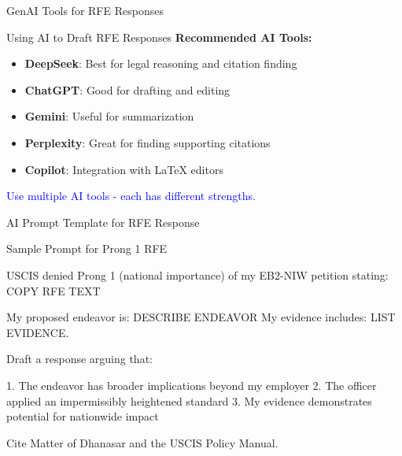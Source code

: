 \documentclass[11pt]{beamer}
\begin{document}
	
	\begin{frame}{GenAI Tools for RFE Responses}
		\scriptsize
		\begin{block}{Using AI to Draft RFE Responses}
			\textbf{Recommended AI Tools:}
			\begin{itemize}
				\item \textbf{DeepSeek}: Best for legal reasoning and citation finding
				\item \textbf{ChatGPT}: Good for drafting and editing
				\item \textbf{Gemini}: Useful for summarization
				\item \textbf{Perplexity}: Great for finding supporting citations
				\item \textbf{Copilot}: Integration with LaTeX editors
			\end{itemize}
			\textcolor{blue}{Use multiple AI tools - each has different strengths.}
		\end{block}
	\end{frame}
	
	\begin{frame}{AI Prompt Template for RFE Response}
		\scriptsize
		\begin{block}{Sample Prompt for Prong 1 RFE}
		
				USCIS denied Prong 1 (national importance) of my EB2-NIW petition stating: COPY RFE TEXT
				
				My proposed endeavor is: DESCRIBE ENDEAVOR				
				My evidence includes: LIST EVIDENCE.
				
				Draft a response arguing that:
				
				1. The endeavor has broader implications beyond my employer
				2. The officer applied an impermissibly heightened standard
				3. My evidence demonstrates potential for nationwide impact
				
				Cite Matter of Dhanasar and the USCIS Policy Manual.
		
		\end{block}
	\end{frame}
	
\end{document}
